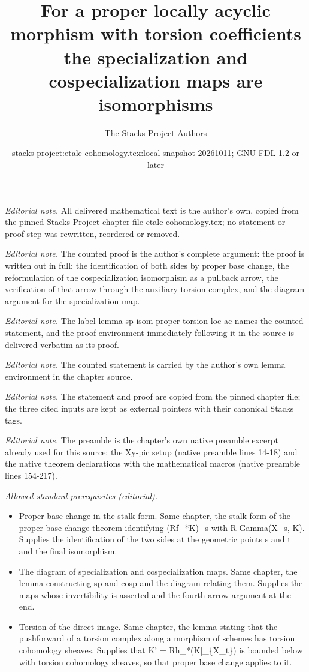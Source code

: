 \documentclass[10pt,a4paper]{amsart}
\title{For a proper locally acyclic morphism with torsion coefficients the specialization and cospecialization maps are isomorphisms}
\author{The Stacks Project Authors}
\date{stacks-project:etale-cohomology.tex:local-snapshot-20261011; GNU FDL 1.2 or later}
\theoremstyle{plain}
\theoremstyle{definition}
\theoremstyle{remark}
\numberwithin{equation}{subsection}
\begin{document}
\maketitle
\noindent\textit{Editorial note.} All delivered mathematical text is the author's own, copied from the pinned Stacks Project chapter file etale-cohomology.tex; no statement or proof step was rewritten, reordered or removed.\par\medskip
\noindent\textit{Editorial note.} The counted proof is the author's complete argument: the proof is written out in full: the identification of both sides by proper base change, the reformulation of the cospecialization isomorphism as a pullback arrow, the verification of that arrow through the auxiliary torsion complex, and the diagram argument for the specialization map.\par\medskip
\noindent\textit{Editorial note.} The label lemma-sp-isom-proper-torsion-loc-ac names the counted statement, and the proof environment immediately following it in the source is delivered verbatim as its proof.\par\medskip
\noindent\textit{Editorial note.} The counted statement is carried by the author's own lemma environment in the chapter source.\par\medskip
\noindent\textit{Editorial note.} The statement and proof are copied from the pinned chapter file; the three cited inputs are kept as external pointers with their canonical Stacks tags.\par\medskip
\noindent\textit{Editorial note.} The preamble is the chapter's own native preamble excerpt already used for this source: the Xy-pic setup (native preamble lines 14-18) and the native theorem declarations with the mathematical macros (native preamble lines 154-217).\par\medskip
\noindent\textit{Allowed standard prerequisites (editorial).}\begin{itemize}
\item Proper base change in the stalk form. Same chapter, the stalk form of the proper base change theorem identifying (Rf\_*K)\_s with R Gamma(X\_s, K). Supplies the identification of the two sides at the geometric points s and t and the final isomorphism.
\item The diagram of specialization and cospecialization maps. Same chapter, the lemma constructing sp and cosp and the diagram relating them. Supplies the maps whose invertibility is asserted and the fourth-arrow argument at the end.
\item Torsion of the direct image. Same chapter, the lemma stating that the pushforward of a torsion complex along a morphism of schemes has torsion cohomology sheaves. Supplies that K' = Rh\_*(K|\_\{X\_t\}) is bounded below with torsion cohomology sheaves, so that proper base change applies to it.
\end{itemize}\medskip
\end{document}
